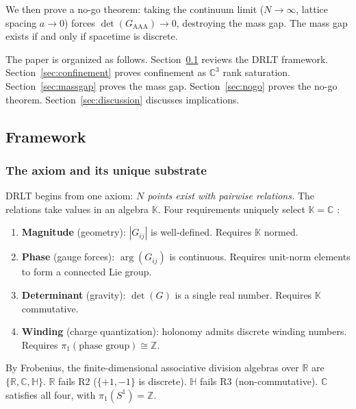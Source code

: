 \documentclass[12pt]{article}
\theoremstyle{remark}
\theoremstyle{definition}
\newcommand{\CC}{\mathbb{C}}
\newcommand{\RR}{\mathbb{R}}
\begin{document}
We then prove a no-go theorem: taking the continuum limit
($N \to \infty$, lattice spacing $a \to 0$) forces
$\det(G_{\mathrm{AAA}}) \to 0$, destroying the mass gap. The mass gap
exists if and only if spacetime is discrete.

The paper is organized as follows. Section~\ref{sec:framework} reviews
the DRLT framework. Section~\ref{sec:confinement} proves confinement as
$\CC^3$ rank saturation. Section~\ref{sec:massgap} proves the
mass gap. Section~\ref{sec:nogo} proves the no-go theorem.
Section~\ref{sec:discussion} discusses implications.

\subsection{Framework}
\label{sec:framework}

\subsubsection{The axiom and its unique substrate}

DRLT begins from one axiom: \emph{$N$ points exist with pairwise
relations.} The relations take values in an algebra $\mathbb{K}$.
Four requirements uniquely select $\mathbb{K} = \CC$
\cite{Frobenius}:

\begin{enumerate}
\item[\textbf{R1.}] \textbf{Magnitude} (geometry): $|G_{ij}|$ is
  well-defined. Requires $\mathbb{K}$ normed.
\item[\textbf{R2.}] \textbf{Phase} (gauge forces): $\arg(G_{ij})$ is
  continuous. Requires unit-norm elements to form a connected Lie group.
\item[\textbf{R3.}] \textbf{Determinant} (gravity): $\det(G)$ is a
  single real number. Requires $\mathbb{K}$ commutative.
\item[\textbf{R4.}] \textbf{Winding} (charge quantization): holonomy
  admits discrete winding numbers. Requires
  $\pi_1(\text{phase group}) \cong \mathbb{Z}$.
\end{enumerate}

\noindent
By Frobenius, the finite-dimensional associative division algebras over
$\RR$ are $\{\RR, \CC, \mathbb{H}\}$. $\RR$
fails R2 ($\{+1,-1\}$ is discrete). $\mathbb{H}$ fails R3
(non-commutative). $\CC$ satisfies all four, with
$\pi_1(S^1) = \mathbb{Z}$.
\end{document}
